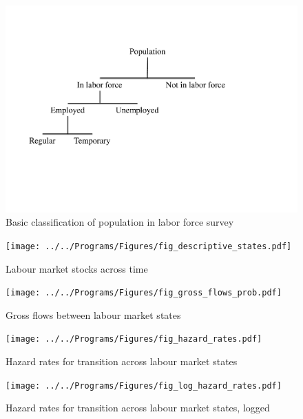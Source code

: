 \begin{figure}
	\includegraphics[scale=0.65, trim=2cm 6cm 7cm 4cm, clip]{Figures/population}
	\caption{Basic classification of population in labor force survey}
	\label{fig:LFS_clas}
\end{figure}

\begin{landscape}
\begin{figure}
\centering
	\texttt{[image: ../../Programs/Figures/fig\_descriptive\_states.pdf]}
	\caption{Labour market stocks across time}
	\label{fig:LFS_states}
\end{figure}
\end{landscape}

\begin{landscape}
\begin{figure}
\centering
	\texttt{[image: ../../Programs/Figures/fig\_gross\_flows\_prob.pdf]}
	\caption{Gross flows between labour market states}
	\label{fig:LFS_states}
\end{figure}
\end{landscape}

\begin{landscape}
\begin{figure}
\centering
	\texttt{[image: ../../Programs/Figures/fig\_hazard\_rates.pdf]}
	\caption{Hazard rates for transition across labour market states}
	\label{fig:hazard_rates}
\end{figure}
\end{landscape}

\begin{landscape}
\begin{figure}
\centering
	\texttt{[image: ../../Programs/Figures/fig\_log\_hazard\_rates.pdf]}
	\caption{Hazard rates for transition across labour market states, logged}
	\label{fig:log_hazard_rates}
\end{figure}
\end{landscape}

